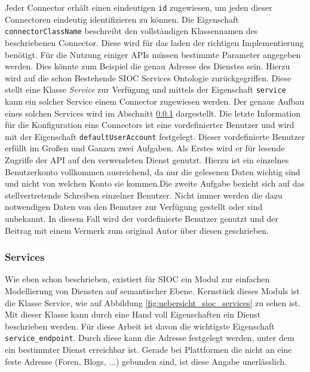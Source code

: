 Jeder Connector erhält einen eindeutigen \texttt{id} zugewiesen, um jeden dieser Connectoren eindeutig identifizieren zu können. Die Eigenschaft \texttt{connectorClassName} beschreibt den vollständigen Klassennamen des beschriebenen Connector. Diese wird für das laden der richtigen Implementierung benötigt. Für die Nutzung einiger APIs müssen bestimmte Parameter angegeben werden. Dies könnte zum Beispiel die genau Adresse des Dienstes sein. Hierzu wird auf die schon Bestehende SIOC Services Ontologie zurückgegriffen. Diese stellt eine Klasse \emph{Service} zur Verfügung und mittels der Eigenschaft \texttt{service} kann ein solcher Service einem Connector zugewiesen werden. Der genaue Aufbau eines solchen Services wird im Abschnitt \ref{ssub:services} dargestellt. Die letzte Information für die Konfiguration eins Connectors ist eine vordefinierter Benutzer und wird mit der Eigenschaft \texttt{defaultUserAccount} festgelegt. Dieser vordefinierte Benutzer erfüllt im Großen und Ganzen zwei Aufgaben. Als Erstes wird er für lesende Zugriffe der API auf den verwendeten Dienst genutzt. Hierzu ist ein einzelnes Benutzerkonto vollkommen ausreichend, da nur die gelesenen Daten wichtig sind und nicht von welchen Konto sie kommen.Die zweite Aufgabe bezieht sich auf das stellvertretende Schreiben einzelner Benutzer. Nicht immer werden die dazu notwendigen Daten von den Benutzer zur Verfügung gestellt oder sind unbekannt. In diesem Fall wird der vordefinierte Benutzer genutzt und der Beitrag mit einem Vermerk zum original Autor über diesen geschrieben.


\subsubsection{Services} %
\label{ssub:services}

Wie eben schon beschrieben, existiert für SIOC ein Modul zur einfachen Modellierung von Diensten auf semantischer Ebene. Kernstück dieses Moduls ist die Klasse Service, wie auf Abbildung \ref{fig:uebersicht_sioc_services} zu sehen ist. Mit dieser Klasse kann durch eine Hand voll Eigenschaften ein Dienst beschrieben werden. Für diese Arbeit ist davon die wichtigste Eigenschaft \texttt{service\_endpoint}. Durch diese kann die Adresse festgelegt werden, unter dem ein bestimmter Dienst erreichbar ist. Gerade bei Plattformen die nicht an eine feste Adresse (Foren, Blogs, $\dots$) gebunden sind, ist diese Angabe unerlässlich. 

